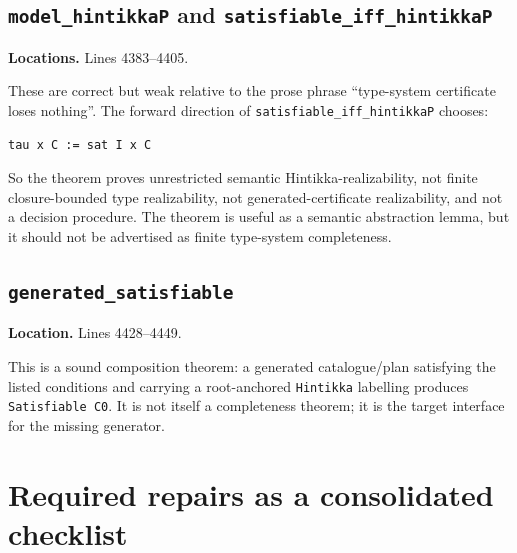 \documentclass[11pt]{article}
\begin{document}
\subsection{\texttt{model\_hintikkaP} and \texttt{satisfiable\_iff\_hintikkaP}}

\textbf{Locations.} Lines 4383--4405.

These are correct but weak relative to the prose phrase ``type-system
certificate loses nothing''.  The forward direction of
\texttt{satisfiable\_iff\_hintikkaP} chooses:
\begin{lstlisting}
tau x C := sat I x C
\end{lstlisting}
So the theorem proves unrestricted semantic Hintikka-realizability, not finite
closure-bounded type realizability, not generated-certificate realizability, and
not a decision procedure.  The theorem is useful as a semantic abstraction
lemma, but it should not be advertised as finite type-system completeness.

\subsection{\texttt{generated\_satisfiable}}

\textbf{Location.} Lines 4428--4449.

This is a sound composition theorem: a generated catalogue/plan satisfying the
listed conditions and carrying a root-anchored \texttt{Hintikka} labelling
produces \texttt{Satisfiable C0}.  It is not itself a completeness theorem; it
is the target interface for the missing generator.

\section{Required repairs as a consolidated checklist}
\end{document}
